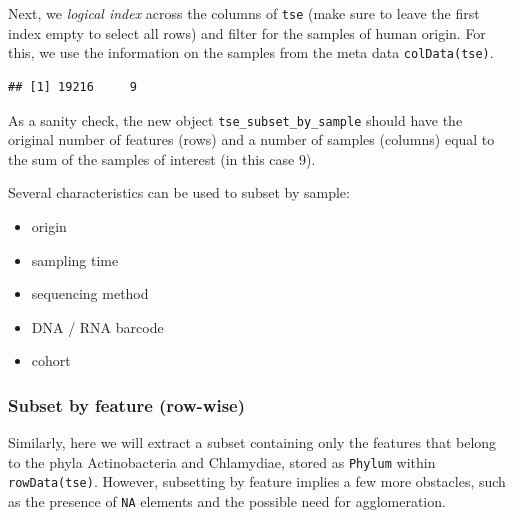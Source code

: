 \documentclass[
]{book}
\newenvironment{Shaded}{\begin{snugshade}}{\end{snugshade}}
\newcommand{\CommentTok}[1]{\textcolor[rgb]{0.56,0.35,0.01}{\textit{#1}}}
\newcommand{\FunctionTok}[1]{\textcolor[rgb]{0.00,0.00,0.00}{#1}}
\newcommand{\NormalTok}[1]{#1}
\newcommand{\OtherTok}[1]{\textcolor[rgb]{0.56,0.35,0.01}{#1}}
\newcommand{\SpecialCharTok}[1]{\textcolor[rgb]{0.00,0.00,0.00}{#1}}
\newcommand{\StringTok}[1]{\textcolor[rgb]{0.31,0.60,0.02}{#1}}
\providecommand{\tightlist}{%
  \setlength{\itemsep}{0pt}\setlength{\parskip}{0pt}}
\begin{document}
Next, we \emph{logical index} across the columns of \texttt{tse} (make sure to
leave the first index empty to select all rows) and filter for the
samples of human origin. For this, we use the information on the
samples from the meta data \texttt{colData(tse)}.

\begin{Shaded}
\end{Shaded}

\begin{verbatim}
## [1] 19216     9
\end{verbatim}

As a sanity check, the new object \texttt{tse\_subset\_by\_sample} should have
the original number of features (rows) and a number of samples
(columns) equal to the sum of the samples of interest (in this case
9).

Several characteristics can be used to subset by sample:

\begin{itemize}
\tightlist
\item
  origin
\item
  sampling time
\item
  sequencing method
\item
  DNA / RNA barcode
\item
  cohort
\end{itemize}

\hypertarget{subset-by-feature-row-wise}{%
\subsubsection{Subset by feature (row-wise)}\label{subset-by-feature-row-wise}}

Similarly, here we will extract a subset containing only the features
that belong to the phyla Actinobacteria and Chlamydiae, stored as
\texttt{Phylum} within \texttt{rowData(tse)}. However, subsetting by feature implies
a few more obstacles, such as the presence of \texttt{NA} elements and the
possible need for agglomeration.
\end{document}

